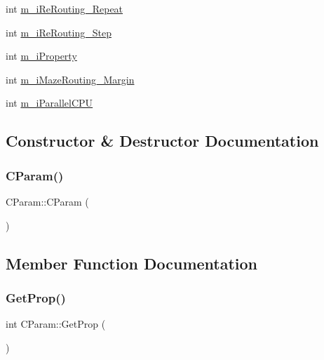 \begin{DoxyCompactItemize}
\item 
int \mbox{\hyperlink{classCParam_ac09a9aa1adb3c76211a7e8d7ae32046a}{m\+\_\+i\+Re\+Routing\+\_\+\+Repeat}}
\item 
int \mbox{\hyperlink{classCParam_a7cc9b8a4ed5e875571d147f0aa9cca3d}{m\+\_\+i\+Re\+Routing\+\_\+\+Step}}
\item 
int \mbox{\hyperlink{classCParam_a0539ab55b3585f09ae19eb908d9fb0ae}{m\+\_\+i\+Property}}
\item 
int \mbox{\hyperlink{classCParam_a2595743ed222350198897d197380ad05}{m\+\_\+i\+Maze\+Routing\+\_\+\+Margin}}
\item 
int \mbox{\hyperlink{classCParam_a7a96efcd316f32330f149e92aca9bc6d}{m\+\_\+i\+Parallel\+C\+PU}}
\end{DoxyCompactItemize}


\subsection{Constructor \& Destructor Documentation}
\mbox{\label{classCParam_a97624fd3217162f4883d1b2e368def78}} 
\subsubsection{\texorpdfstring{CParam()}{CParam()}}
{\footnotesize\ttfamily C\+Param\+::\+C\+Param (\begin{DoxyParamCaption}{ }\end{DoxyParamCaption})}



\subsection{Member Function Documentation}
\mbox{\label{classCParam_ae85a70e5fa088df9f52e81f1fdd1a283}} 
\subsubsection{\texorpdfstring{GetProp()}{GetProp()}}
{\footnotesize\ttfamily int C\+Param\+::\+Get\+Prop (\begin{DoxyParamCaption}{ }\end{DoxyParamCaption})\hspace{0.3cm}{\ttfamily [inline]}}



